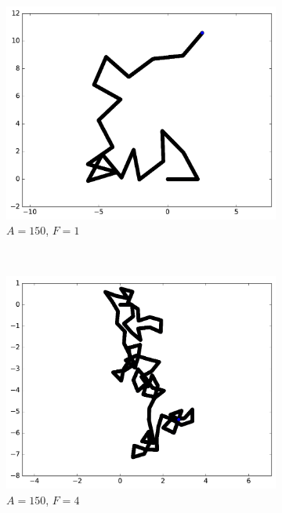 \begin{appendices}
\begin{figure}[htbp]
\begin{subfigure}[t]{\subImgWmo}
			\includegraphics[width=\textwidth]{figures/ch3/synTraj_219_150_1}
			\caption[$A = 150$, $F=1$]{$A = 150$, $F=1$}
			\label{fig:synTraj_219_150_1}
		\end{subfigure}
		~
		\begin{subfigure}[t]{\subImgWmo}
			\centering
			\includegraphics[width=\textwidth]{figures/ch3/synTraj_219_150_4}
			\caption[$A = 150$, $F=4$]{$A = 150$, $F=4$}
			\label{fig:synTraj_219_150_4}
		\end{subfigure}
		~
		\begin{subfigure}[t]{\subImgWmo}
			\centering

\end{subfigure}
\end{figure}
\end{appendices}
